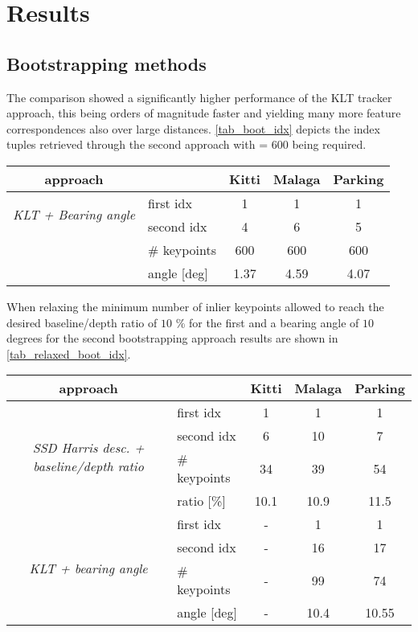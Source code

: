 \section{Results}
\label{sec_results}

\subsection{Bootstrapping methods}
The comparison showed a significantly higher performance of the KLT tracker approach, this being orders of magnitude faster and yielding many more feature correspondences also over large distances. \cref{tab_boot_idx} depicts the index tuples retrieved through the second approach with  = $600$ being required.
\begin{center}
	\begin{tabular}{ c | l | c  c  c }
		approach &				 &				Kitti &		Malaga &	Parking\\
  		\hline
 \multirow{2}{*}{\textit{KLT + Bearing angle}} &	first idx &	1 & 		1 & 		1\\
  		 & 						second idx &	4 & 		6 & 		5\\
  		& 						\# keypoints & 				600 & 		600 & 		600\\
  		&						angle [deg] & 				1.37 &			4.59 &			4.07\\
  		\hline
	\end{tabular}
	\label{tab_boot_idx}
\end{center}

When relaxing the minimum number of inlier keypoints allowed to reach the desired baseline/depth ratio of $10$ \% for the first and a bearing angle of $10$ degrees for the second bootstrapping approach results are shown in \cref{tab_relaxed_boot_idx}.
\begin{center}
	\begin{tabular}{ c | l | c  c  c }
		approach &				 &				Kitti &		Malaga &	Parking\\
  		\hline
 \multirow{4}{*}{\textit{SSD Harris desc. + baseline/depth ratio}} 
 		&						first idx &			1 & 		1 & 		1\\
  		& 						second idx &		6 & 		10 & 		7\\
  		& 						\# keypoints & 		34 & 		39 & 		54\\
  		&						ratio [\%] & 		10.1 &		10.9 &		11.5\\
  		\hline
  \multirow{4}{*}{\textit{KLT + bearing angle}} 
  		&						first idx &			- & 		1 & 		1\\
  		& 						second idx &		- & 		16 & 		17\\
  		& 						\# keypoints & 		- & 		99 & 		74\\
  		&						angle [deg] & 		- &			10.4 &		10.55\\
  		\hline
	\end{tabular}
	\label{tab_relaxed_boot_idx}
\end{center}


